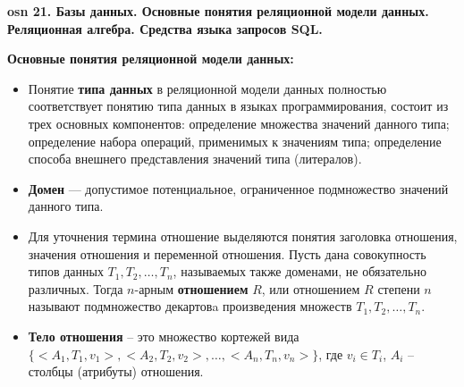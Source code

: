 \setcounter{section}{15}
\setcounter{subsection}{21}
\setcounter{equation}{0}
\textbf{\LARGE osn 21. Базы данных. Основные понятия реляционной модели данных. Реляционная алгебра. Средства языка запросов SQL.}


\textbf{Основные понятия реляционной модели данных:}

\begin{itemize}
    \item Понятие \textbf{типа данных} в реляционной модели данных полностью соответствует понятию типа данных в языках программирования, состоит из трех основных компонентов: определение множества значений данного типа; определение набора операций, применимых к значениям типа; определение способа внешнего представления значений типа (литералов).
    \item \textbf{Домен} --- допустимое потенциальное, ограниченное подмножество значений данного типа.
    \item Для уточнения термина отношение выделяются понятия заголовка отношения, значения отношения и переменной отношения.
    Пусть дана совокупность типов данных $T_1, T_2, \dots, T_n$, называемых также доменами, не обязательно различных. Тогда $n$-арным \textbf{отношением} $R$, или отношением $R$ степени $n$ называют подмножество декартовa произведения множеств $T_1, T_2, \dots, T_n$.
    \item \textbf{Тело отношения} -- это множество кортежей вида $\{<A_1, T_1, v_1>, < A_2, T_2, v_2 >,\dots, < A_n, T_n, v_n>\}$, где $v_i \in T_i$, $A_i$ -- столбцы (атрибуты) отношения. 

\end{itemize}

